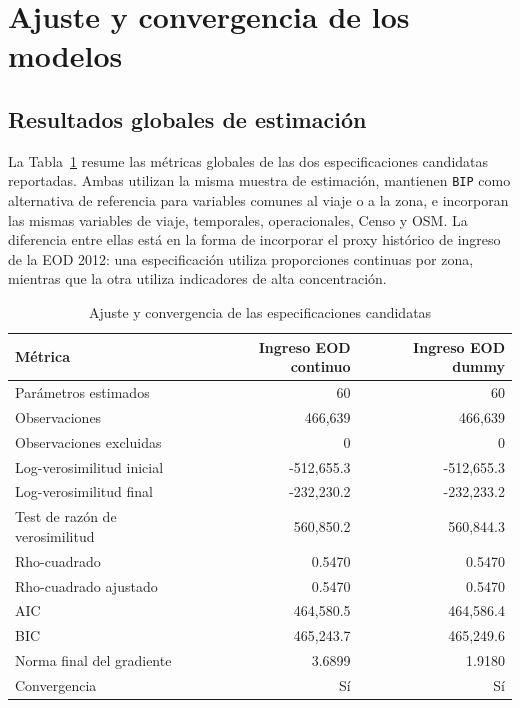 \section{Ajuste y convergencia de los modelos}

\subsection{Resultados globales de estimación}

La Tabla~\ref{tab:ajuste_convergencia} resume las métricas globales de las dos
especificaciones candidatas reportadas. Ambas utilizan la misma muestra de estimación, mantienen
\texttt{BIP} como alternativa de referencia para variables comunes al viaje o a la zona, e
incorporan las mismas variables de viaje, temporales, operacionales, Censo y OSM. La diferencia
entre ellas está en la forma de incorporar el proxy histórico de ingreso de la EOD 2012: una
especificación utiliza proporciones continuas por zona, mientras que la otra utiliza indicadores de
alta concentración.

\begin{table}[htbp]
\centering
\small
\caption{Ajuste y convergencia de las especificaciones candidatas}
\label{tab:ajuste_convergencia}
\begin{tabular}{lrr}
\toprule
Métrica & Ingreso EOD continuo & Ingreso EOD dummy \\
\midrule
Parámetros estimados & 60 & 60 \\
Observaciones & 466{,}639 & 466{,}639 \\
Observaciones excluidas & 0 & 0 \\
Log-verosimilitud inicial & -512{,}655.3 & -512{,}655.3 \\
Log-verosimilitud final & -232{,}230.2 & -232{,}233.2 \\
Test de razón de verosimilitud & 560{,}850.2 & 560{,}844.3 \\
Rho-cuadrado & 0.5470 & 0.5470 \\
Rho-cuadrado ajustado & 0.5470 & 0.5470 \\
AIC & 464{,}580.5 & 464{,}586.4 \\
BIC & 465{,}243.7 & 465{,}249.6 \\
Norma final del gradiente & 3.6899 & 1.9180 \\
Convergencia & Sí & Sí \\
\bottomrule
\end{tabular}
\end{table}

